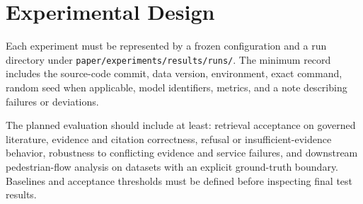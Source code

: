 \section{Experimental Design}

Each experiment must be represented by a frozen configuration and a run directory under \texttt{paper/experiments/results/runs/}. The minimum record includes the source-code commit, data version, environment, exact command, random seed when applicable, model identifiers, metrics, and a note describing failures or deviations.

The planned evaluation should include at least: retrieval acceptance on governed literature, evidence and citation correctness, refusal or insufficient-evidence behavior, robustness to conflicting evidence and service failures, and downstream pedestrian-flow analysis on datasets with an explicit ground-truth boundary. Baselines and acceptance thresholds must be defined before inspecting final test results.
